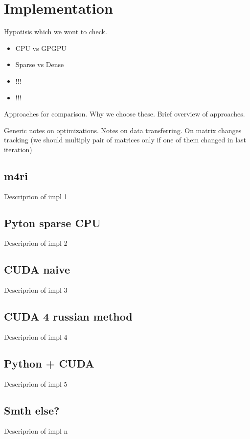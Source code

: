\section{Implementation}

Hypotisis which we wont to check.
\begin{itemize}
  \item CPU vs GPGPU
  \item Sparse vs Dense
  \item !!!
  \item !!!
\end{itemize}

Approaches for comparison. Why we choose these.
Brief overview of approaches.

Generic notes on optimizations.
Notes on data transferring.
On matrix changes tracking (we should multiply pair of matrices only if one of them changed in last iteration)

\subsection{m4ri}

Descriprion of impl 1

\subsection{Pyton sparse CPU}

Descriprion of impl 2

\subsection{CUDA naive}

Descriprion of impl 3

\subsection{CUDA 4 russian method}

Descriprion of impl 4

\subsection{Python + CUDA}

Descriprion of impl 5

\subsection{Smth else?}

Descriprion of impl n
